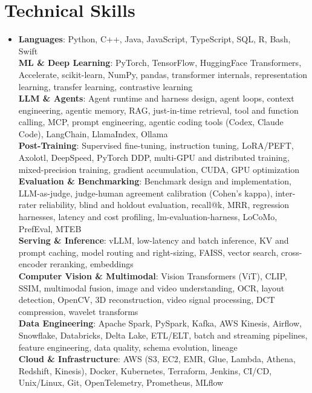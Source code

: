 \documentclass[letterpaper,10pt]{article}
\newcommand{\titleItem}[1]{\textbf{#1}}
\begin{document}
\section{Technical Skills}\vspace{1mm}
 \begin{itemize}[leftmargin=0.15in, label=]
    \item{
\titleItem{Languages}{: Python, C++, Java, JavaScript, TypeScript, SQL, R, Bash, Swift } \\
\titleItem{ML \& Deep Learning}{: PyTorch, TensorFlow, HuggingFace Transformers, Accelerate, scikit-learn, NumPy, pandas, transformer internals, representation learning, transfer learning, contrastive learning} \\
\titleItem{LLM \& Agents}{: Agent runtime and harness design, agent loops, context engineering, agentic memory, RAG, just-in-time retrieval, tool and function calling, MCP, prompt engineering, agentic coding tools (Codex, Claude Code), LangChain, LlamaIndex, Ollama} \\
\titleItem{Post-Training}{: Supervised fine-tuning, instruction tuning, LoRA/PEFT, Axolotl, DeepSpeed, PyTorch DDP, multi-GPU and distributed training, mixed-precision training, gradient accumulation, CUDA, GPU optimization} \\
\titleItem{Evaluation \& Benchmarking}{: Benchmark design and implementation, LLM-as-judge, judge-human agreement calibration (Cohen's kappa), inter-rater reliability, blind and holdout evaluation, recall@k, MRR, regression harnesses, latency and cost profiling, lm-evaluation-harness, LoCoMo, PrefEval, MTEB} \\
\titleItem{Serving \& Inference}{: vLLM, low-latency and batch inference, KV and prompt caching, model routing and right-sizing, FAISS, vector search, cross-encoder reranking, embeddings} \\
\titleItem{Computer Vision \& Multimodal}{: Vision Transformers (ViT), CLIP, SSIM, multimodal fusion, image and video understanding, OCR, layout detection, OpenCV, 3D reconstruction, video signal processing, DCT compression, wavelet transforms} \\
\titleItem{Data Engineering}{: Apache Spark, PySpark, Kafka, AWS Kinesis, Airflow, Snowflake, Databricks, Delta Lake, ETL/ELT, batch and streaming pipelines, feature engineering, data quality, schema evolution, lineage} \\
\titleItem{Cloud \& Infrastructure}{: AWS (S3, EC2, EMR, Glue, Lambda, Athena, Redshift, Kinesis), Docker, Kubernetes, Terraform, Jenkins, CI/CD, Unix/Linux, Git, OpenTelemetry, Prometheus, MLflow} \\
}
\end{itemize}
\end{document}

